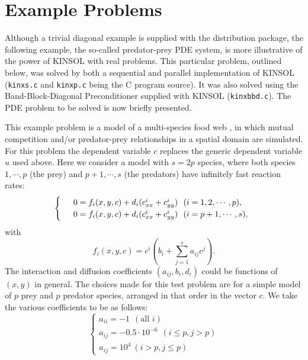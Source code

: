 \documentclass[11pt]{article}
\begin{document}
\section{Example Problems}


Although a trivial diagonal example is supplied with the distribution package, 
the following example,  the so-called predator-prey PDE system, is more 
illustrative of the power of KINSOL with real problems. This particular 
problem, outlined below, was solved by both a sequential and parallel
implementation of KINSOL ({\tt kinxs.c} and {\tt kinxp.c} being the C program 
source). It was also solved using the Band-Block-Diagonal Preconditioner 
supplied with KINSOL ({\tt kinxbbd.c}). The PDE problem to be solved is now 
briefly presented.

This example problem is a model of a multi-species food web \cite{Br86},
in which mutual competition and/or predator-prey relationships in a
spatial domain are simulated. For this problem the dependent variable $c$ 
replaces the generic dependent variable $u$ used above. Here we consider a 
model with $s = 2p$ species, where both species $1,\cdots , p$ (the
prey) and $p+1,\cdots, s$ (the predators) have infinitely fast reaction
rates:
\begin{equation}
\renewcommand{\arraystretch}{1.2}
\left\{
\begin{array}{l}
               \hspace*{1em}  0 = f_i(x,y,c) + d_i 
( c^i_{xx} + c^i_{yy} ) ~ ~ (i = 1,2,\cdots,p) , \\
               \hspace*{1em}  0 = f_i(x,y,c) + d_i 
( c^i_{xx} + c^i_{yy} ) ~ ~ (i = p+1,\cdots,s) ,
\end{array} \right.  \label{5.3}
\end{equation}
with
\begin{equation}
f_i(x,y,c) = c^i (b_i + \sum_{j = 1}^s a_{ij} c^j).
\end{equation}
The interaction and diffusion coefficients $(a_{ij},b_i,d_i)$
could be functions of $(x,y)$ in general. The choices made for
this test problem are for a simple model of $p$ prey and $p$
predator species, arranged in that order in the vector $c$.  We
take the various coefficients to be as follows:
\begin{equation}
\left\{
\begin{array}{l}
a_{ii} = -1 ~ ~ (\mbox{all } i) \\
a_{ij} = -0.5 \cdot 10^{-6} ~ ~ ( i \leq p , j > p )
\\
a_{ij} = 10^4 ~ ( i > p , j \leq p )
\end{array}  \right.
\end{equation}
\end{document}
